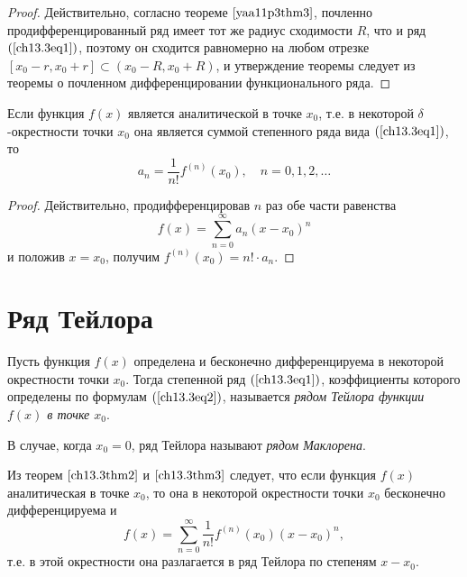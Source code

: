 \begin{proof}
Действительно, согласно теореме $\ref{yaa11p3thm3}$, почленно продифференцированный ряд имеет тот же радиус сходимости $R$, что и ряд $(\ref{ch13.3eq1})$, поэтому он сходится равномерно на любом отрезке $[x_0 - r, x_0 + r] \subset (x_0 - R, x_0 + R)$, и утверждение теоремы следует из теоремы о почленном дифференцировании функционального ряда.
\end{proof}

\begin{thm} \label{ch13.3thm3}
Если функция $f(x)$ является аналитической в точке $x_0$, т.е. в некоторой $\delta$-окрестности точки $x_0$ она является суммой степенного ряда вида $(\ref{ch13.3eq1})$, то
\begin{equation} \label{ch13.3eq2}
a_n = \frac{1}{n!} f^{(n)}(x_0), \quad n = 0, 1, 2, \ldots
\end{equation}
\end{thm}
\begin{proof}
Действительно, продифференцировав $n$ раз обе части равенства
$$
f(x) = \sum\limits_{n = 0}^{\infty} a_n(x - x_0)^n
$$
и положив $x = x_0$, получим $f^{(n)}(x_0) = n!\cdot a_n$.
\end{proof}
\section{Ряд Тейлора}

\begin{defn}
Пусть функция $f(x)$ определена и бесконечно дифференцируема в некоторой окрестности точки $x_0$. Тогда степенной ряд $(\ref{ch13.3eq1})$, коэффициенты которого определены по формулам $(\ref{ch13.3eq2})$, называется \textit{рядом Тейлора функции $f(x)$ в точке $x_0$}.

В случае, когда $x_0 = 0$, ряд Тейлора называют \textit{рядом Маклорена}.

Из теорем $\ref{ch13.3thm2}$ и $\ref{ch13.3thm3}$ следует, что если функция $f(x)$ аналитическая в точке $x_0$, то она в некоторой окрестности точки $x_0$ бесконечно дифференцируема и
$$
f(x) = \sum\limits_{n = 0}^{\infty} \frac{1}{n!}f^{(n)}(x_0)(x - x_0)^n,
$$
т.е. в этой окрестности она разлагается в ряд Тейлора по степеням $x - x_0$.
\end{defn}

